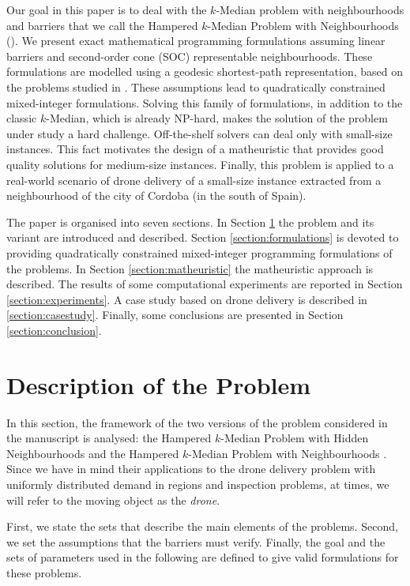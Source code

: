 \documentclass[a4paper,  review, authoryear, 1p.]{elsarticle}
\newcommand{\KMPHN}{{\sf{H-KMPHN}}}
\newcommand{\KMPN}{{\sf{H-KMPN}\xspace }}
\newcommand{\JP}[1]{{\color{blue}#1}}
\newcommand{\CV}[1]{{\color{blue}#1}}
\begin{document}
	Our goal in this paper is to deal with the $k$-Median problem with neighbourhoods and barriers that we call the Hampered $k$-Median Problem with Neighbourhoods (\KMPN). We present exact mathematical programming formulations assuming linear barriers and second-order cone (SOC) representable neighbourhoods. These formulations are modelled using a geodesic shortest-path representation, based on the problems studied in \citet{mitchell2017}. These assumptions lead to quadratically constrained mixed-integer formulations. Solving this family of formulations, in addition to the classic $k$-Median, \JP{which is already NP-hard}, makes the solution of the problem under study a hard challenge. \CV{Off}-the-shelf solvers can deal only with small-size instances. This fact motivates the design of a matheuristic that provides good quality solutions for medium-size instances. \JP{Finally, this problem is applied to a real-world scenario of drone delivery of a small-size instance extracted from a neighbourhood of the city of Cordoba (in the south of Spain).}
	
	The paper is organised into seven sections. In Section \ref{section:description} the problem and its variant are introduced and described. Section \ref{section:formulations} is devoted to providing quadratically constrained mixed-integer programming formulations of the problems. In Section \ref{section:matheuristic} the matheuristic approach is described. The results of some computational experiments are reported in Section \ref{section:experiments}. \CV{A case study based on drone delivery is described in \ref{section:casestudy}}. Finally, some conclusions are presented in Section \ref{section:conclusion}.
	
	
	\section{Description of the Problem}\label{section:description}
	In this section, the framework of the two versions of the problem considered in the manuscript is analysed: the Hampered $k$-Median Problem with Hidden Neighbourhoods \KMPHN\xspace and the Hampered $k$-Median Problem with Neighbourhoods \KMPN. Since we have in mind their applications to the drone delivery problem with uniformly distributed demand in regions and inspection problems, at times, we will refer to the moving object as the \textit{drone}.
	
	First, we state the sets that describe the main elements of the problems. Second, we set the assumptions that the barriers must verify. Finally, the goal and the sets of parameters used in the following are defined to give valid formulations for these problems.
	
\end{document}
